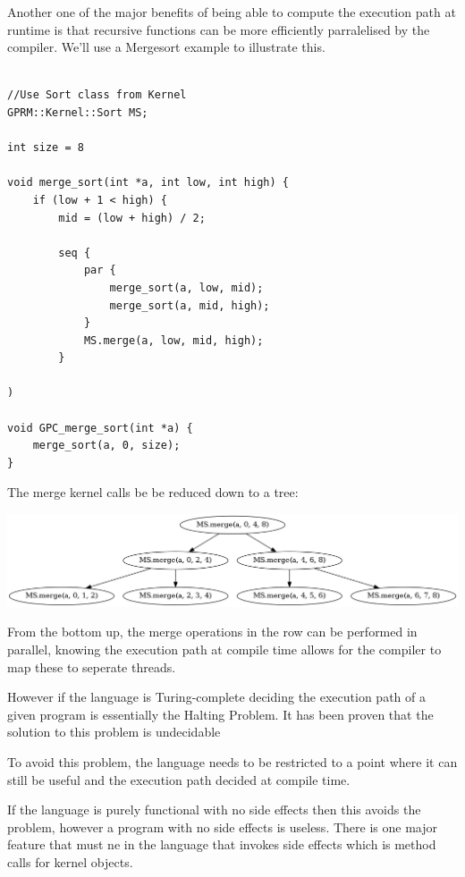 Another one of the major benefits of being able to compute the execution
path at runtime is that recursive functions can be more efficiently parralelised
by the compiler. We'll use a Mergesort example to illustrate this.

\begin{lstlisting}[style=myGPC]

//Use Sort class from Kernel
GPRM::Kernel::Sort MS;

int size = 8

void merge_sort(int *a, int low, int high) {
    if (low + 1 < high) {
        mid = (low + high) / 2;
   
        seq {
            par {
                merge_sort(a, low, mid);
                merge_sort(a, mid, high);
            }
            MS.merge(a, low, mid, high);            
        }
    
)

void GPC_merge_sort(int *a) {
    merge_sort(a, 0, size);
}

\end{lstlisting}

The merge kernel calls be be reduced down to a tree:

\begin{center}
\includegraphics[scale=0.4]{graphs/mergesortTree.png}
\end{center}


From the bottom up, the merge operations in the row can be performed in
parallel, knowing the execution path at compile time allows for the compiler
to map these to seperate threads. 


However if the language is Turing-complete deciding the execution path
of a given program is essentially the Halting Problem. It has been proven that the solution to this problem is undecidable\cite{halting} 

To avoid this problem, the language needs to be restricted to a point where it can still be useful and the execution
path decided at compile time.

If the language is purely functional with no side effects then this avoids the problem, however a program
with no side effects is useless. There is one major feature that must ne in the language that invokes
side effects which is method calls for kernel objects. 

